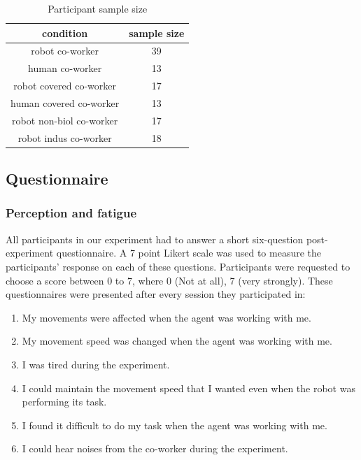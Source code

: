 \begin{table}[hpt]
	\caption{Participant sample size}
	\label{sizeTable}
	\begin{center}
		\begin{tabular}{|c c|}
			\hline  
			{\bf condition} &  {\bf sample size} \\ 
			\hline
			robot co-worker & 39 \\ 
			\hline
			human co-worker & 13 \\
			\hline
			robot covered co-worker & 17 \\
			\hline
			human covered co-worker & 13 \\
			\hline
			robot non-biol co-worker & 17 \\
			\hline
			robot indus co-worker & 18 \\
			\hline 			
		\end{tabular} 
	\end{center}
\end{table}


\subsection{Questionnaire}

\subsubsection{Perception and fatigue}

All participants in our experiment had to answer a short six-question post-experiment questionnaire. A 7 point Likert scale was used to measure the participants' response on each of these questions. Participants were requested to choose a score between 0 to 7, where 0 (Not at all), 7 (very strongly). These questionnaires were presented after every session they participated in:

\begin{enumerate}[start=1,label={Q\arabic*.}]
	\item My movements were affected when the agent was working with me.
	\item My movement speed was changed when the agent was working with me.
	\item I was tired during the experiment.
	\item I could maintain the movement speed that I wanted even when the robot was performing its task.
	\item I found it difficult to do my task when the agent was working with me.
	\item I could hear noises from the co-worker during the experiment.
\end{enumerate}

